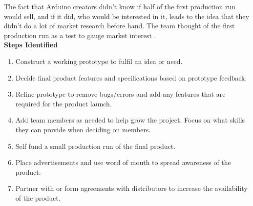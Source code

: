 The fact that Arduino creators didn't know if half of the first production run would sell, and if it did, who would be interested in it, leads to the idea that they didn't do a lot of market research before hand. The team thought of the first production run as a test to gauge market interest
\cite{RN111}. \\

\textbf{Steps Identified}
\begin{enumerate}
\item Construct a working prototype to fulfil an idea or need.
\item Decide final product features and specifications based on prototype feedback.
\item Refine prototype to remove bugs/errors and add any features that are required for the product launch.
\item Add team members as needed to help grow the project. Focus on what skills they can provide when deciding on members.
\item Self fund a small production run of the final product.
\item Place advertisements and use word of mouth to spread awareness of the product.
\item Partner with or form agreements with distributors to increase the availability of the product.
\end{enumerate} 

